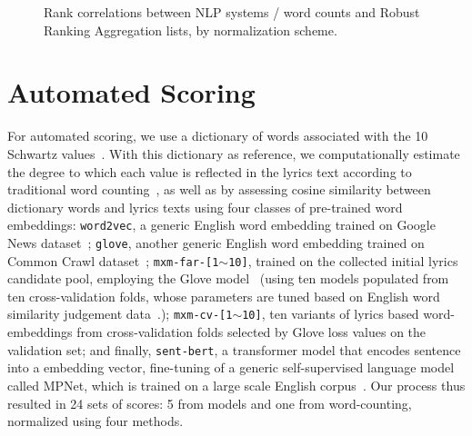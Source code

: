 \documentclass{article}
\begin{document}
\begin{figure}
 \centerline{}
 \caption{Rank correlations between NLP systems / word counts and Robust Ranking Aggregation lists, by normalization scheme.}
 \label{fig:rank_corr}
\end{figure}

\section{Automated Scoring}
For automated scoring, we use a dictionary of words associated with the 10 Schwartz values~\cite{ponizovskiy2020development}. With this dictionary as reference, we computationally estimate the degree to which each value is reflected in the lyrics text according to traditional word counting~\cite{ponizovskiy2020development}, as well as by assessing cosine similarity between dictionary words and lyrics texts using four classes of pre-trained word embeddings: \texttt{word2vec}, a generic English word embedding trained on Google News dataset~\cite{DBLP:conf/nips/MikolovSCCD13}; \texttt{glove}, another generic English word embedding trained on Common Crawl dataset~\cite{DBLP:conf/emnlp/PenningtonSM14}; \texttt{mxm-far-[1$\sim$10]}, trained on the collected initial lyrics candidate pool, employing the Glove model~\cite{DBLP:conf/emnlp/PenningtonSM14} (using ten models populated from ten cross-validation folds, whose parameters are tuned based on English word similarity judgement data~\cite{DBLP:conf/acl/FaruquiD14}.); \texttt{mxm-cv-[1$\sim$10]}, ten variants of lyrics based word-embeddings from cross-validation folds selected by Glove loss values on the validation set; and finally, \texttt{sent-bert}, a transformer model that encodes sentence into a embedding vector, fine-tuning of a generic self-supervised language model called MPNet, which is trained on a large scale English corpus~\cite{DBLP:conf/emnlp/ReimersG19}. Our process thus resulted in 24 sets of scores: 5 from models and one from word-counting, normalized using four methods. 
\end{document}
